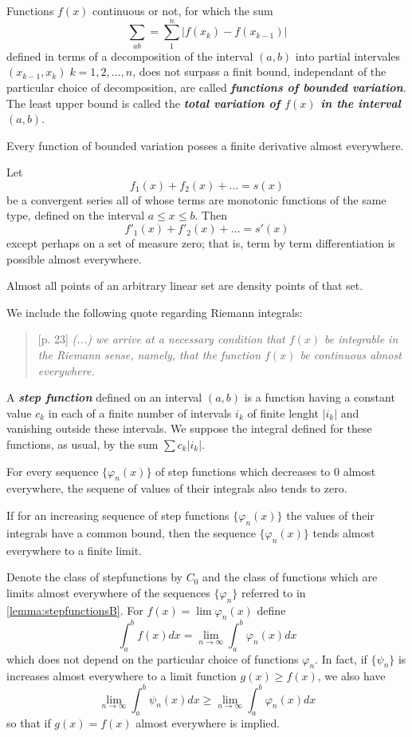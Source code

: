 \documentclass{article}
\theoremstyle{definition}
\numberwithin{equation}{section}
\begin{document}
		Functions $f(x)$ continuous or not, for which the sum
		\[\sum_{ab}=\sum_1^n|f(x_k)-f(x_{k-1})|\]
		defined in terms of a decomposition of the interval $(a,b)$ into partial intervales $(x_{k-1},x_k)\;k=1,2,\ldots,n$, does not surpass a finit bound, independant of the particular choice of decomposition, are called \textbf{\textit{functions of bounded variation}}. The least upper bound is called the \textbf{\textit{total variation of $f(x)$ in the interval $(a,b)$}}.
		\begin{thm}[Lebesgue]
			Every function of bounded variation posses a finite derivative almost everywhere.
		\end{thm}
		\begin{thm}[Fubini]
			Let
			\[f_1(x)+f_2(x)+\ldots=s(x)\]
			be a convergent series all of whose terms are monotonic functions of the same type, defined on the interval $a\leq x\leq b$. Then
			\[f'_1(x)+f'_2(x)+\ldots=s'(x)\]
			except perhaps on a set of measure zero; that is, term by term differentiation is possible almost everywhere.
		\end{thm}
		\begin{thm}[Lebesgue]
			Almost all points of an arbitrary linear set are density points of that set.
		\end{thm}
		We include the following quote regarding Riemann integrals:
		\begin{quotation}[p. 23]
			\textit{(...) we arrive at a necessary condition that $f(x)$ be integrable in the Riemann sense, namely, that the function $f(x)$ be continuous almost everywhere.}
		\end{quotation}
		A \textbf{\textit{step function}} defined on an interval $(a,b)$ is a function having a constant value $c_k$ in each of a finite number of intervals $i_k$ of finite lenght $|i_k|$ and vanishing outside these intervals. We suppose the integral defined for these functions, as usual, by the sum $\sum c_k|i_k|$.
		\begin{lemma}\label{lemma:stepfunctionsA}
			For every sequence $\{\varphi_n(x)\}$ of step functions which decreases to 0 almost everywhere, the sequene of values of their integrals also tends to zero.
		\end{lemma}
		\begin{lemma}\label{lemma:stepfunctionsB}
			If for an increasing sequence of step functions $\{\varphi_n(x)\}$ the values of their integrals have a common bound, then the sequence $\{\varphi_n(x)\}$ tends almost everywhere to a finite limit.
		\end{lemma}
		Denote the class of stepfunctions by $C_0$ and the class of functions which are limits almost everywhere of the sequences $\{\varphi_n\}$ referred to in \cref{lemma:stepfunctionsB}. For $f(x)=\lim\varphi_n(x)$ define
		\[\int_a^bf(x)dx=\lim_{n\to \infty}\int_a^b\varphi_n(x)dx\]
		which does not depend on the particular choice of functions $\varphi_n$. In fact, if $\{\psi_n\}$ is increases almost everywhere to a limit function $g(x)\geq f(x)$, we also have
		\[\lim_{n\to\infty}\int_a^b\psi_n(x)dx\geq\lim_{n\to\infty}\int_a^b\varphi_n(x)dx\]
		so that if $g(x)=f(x)$ almost everywhere is implied.
\end{document}
